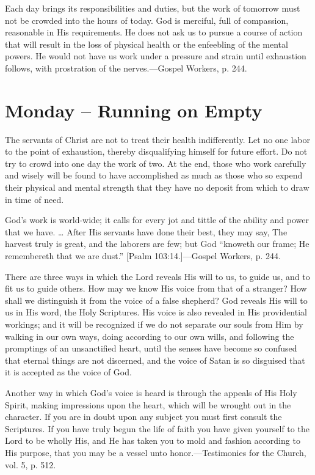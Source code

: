 \documentclass[a4paper, 10pt, twoside, headings=small]{scrartcl}
\begin{document}
\begin{multicols}{2}
Each day brings its responsibilities and duties, but the work of tomorrow must not be crowded into the hours of today. God is merciful, full of compassion, reasonable in His requirements. He does not ask us to pursue a course of action that will result in the loss of physical health or the enfeebling of the mental powers. He would not have us work under a pressure and strain until exhaustion follows, with prostration of the nerves.—Gospel Workers, p. 244.

\section*{Monday – Running on Empty}

The servants of Christ are not to treat their health indifferently. Let no one labor to the point of exhaustion, thereby disqualifying himself for future effort. Do not try to crowd into one day the work of two. At the end, those who work carefully and wisely will be found to have accomplished as much as those who so expend their physical and mental strength that they have no deposit from which to draw in time of need.

God’s work is world-wide; it calls for every jot and tittle of the ability and power that we have. … After His servants have done their best, they may say, The harvest truly is great, and the laborers are few; but God “knoweth our frame; He remembereth that we are dust.” [Psalm 103:14.]—Gospel Workers, p. 244.

There are three ways in which the Lord reveals His will to us, to guide us, and to fit us to guide others. How may we know His voice from that of a stranger? How shall we distinguish it from the voice of a false shepherd? God reveals His will to us in His word, the Holy Scriptures. His voice is also revealed in His providential workings; and it will be recognized if we do not separate our souls from Him by walking in our own ways, doing according to our own wills, and following the promptings of an unsanctified heart, until the senses have become so confused that eternal things are not discerned, and the voice of Satan is so disguised that it is accepted as the voice of God.

Another way in which God’s voice is heard is through the appeals of His Holy Spirit, making impressions upon the heart, which will be wrought out in the character. If you are in doubt upon any subject you must first consult the Scriptures. If you have truly begun the life of faith you have given yourself to the Lord to be wholly His, and He has taken you to mold and fashion according to His purpose, that you may be a vessel unto honor.—Testimonies for the Church, vol. 5, p. 512.


\end{multicols}
\end{document}
